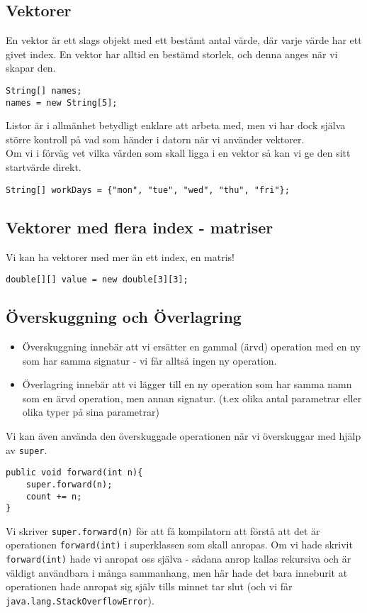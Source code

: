\documentclass[11pt]{article}
\begin{document}
\subsection{Vektorer}
En vektor är ett slags objekt med ett bestämt antal värde, där varje värde har ett givet index.
En vektor har alltid en bestämd storlek, och denna anges när vi skapar den. 
\begin{lstlisting}
String[] names;
names = new String[5];
\end{lstlisting}
Listor är i allmänhet betydligt enklare att arbeta med, men vi har dock själva större kontroll på vad som händer i datorn när vi använder vektorer. \\
Om vi i förväg vet vilka värden som skall ligga i en vektor så kan vi ge den sitt startvärde direkt.
\begin{lstlisting}
String[] workDays = {"mon", "tue", "wed", "thu", "fri"};
\end{lstlisting}
\subsection{Vektorer med flera index - matriser}
Vi kan ha vektorer med mer än ett index, en matris!
\begin{lstlisting}
double[][] value = new double[3][3];
\end{lstlisting}

\subsection{Överskuggning och Överlagring}
\begin{itemize}
\item{ Överskuggning innebär att vi ersätter en gammal (ärvd) operation med en ny som har samma signatur - vi får alltså ingen ny operation. }
\item{ Överlagring innebär att vi lägger till en ny operation som har samma namn som en ärvd operation, men annan signatur. (t.ex olika antal parametrar eller olika typer på sina parametrar) }
\end{itemize}
Vi kan även använda den överskuggade operationen när vi överskuggar med hjälp av \verb+super+. 
\begin{lstlisting}
public void forward(int n){
	super.forward(n);
	count += n;
}
\end{lstlisting}
Vi skriver \verb+super.forward(n)+ för att få kompilatorn att förstå att det är operationen \verb+forward(int)+ i superklassen som skall anropas. Om vi hade skrivit \verb+forward(int)+ hade vi anropat oss själva - sådana anrop kallas rekursiva och är väldigt användbara i många sammanhang, men här hade det bara inneburit at operationen hade anropat sig själv tills minnet tar slut (och vi får \verb+java.lang.StackOverflowError+). 
\end{document}
